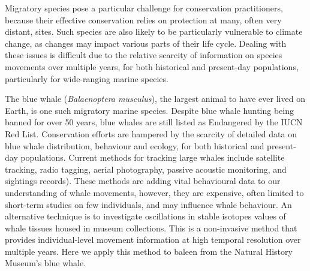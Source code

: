 \documentclass[a4paper,12pt]{article}
\begin{document}
\newpage

Migratory species pose a particular challenge for conservation practitioners, because their effective conservation relies on protection at many, often very distant, sites\cite{runge2014conserving}. 
Such species are also likely to be particularly vulnerable to climate change, as changes may impact various parts of their life cycle\cite{robinson2009travelling}. 
Dealing with these issues is difficult due to the relative scarcity of information on species movements over multiple years, for both historical and present-day populations, particularly for wide-ranging marine species\cite{ryan2013stable,hall2005stable,bailey2009behavioural}. 
 
The blue whale (\textit{Balaenoptera musculus}), the largest animal to have ever lived on Earth, is one such migratory marine species. 
Despite blue whale hunting being banned for over 50 years, blue whales are still listed as Endangered by the IUCN Red List\cite{reilly2008balaenoptera}.
Conservation efforts are hampered by the scarcity of detailed data on blue whale distribution, behaviour and ecology, for both historical and present-day populations. 
Current methods for tracking large whales include satellite tracking, radio tagging, aerial photography, passive acoustic monitoring, and sightings records\cite{borger15,mcdonald2006biogeographic,bailey2009behavioural,mate2007evolution}). 
These methods are adding vital behavioural data to our understanding of whale movements, however, they are expensive, often limited to short-term studies on few individuals\cite{bailey2009behavioural,best2015tag,mate2007evolution}, and may influence whale behaviour\cite{walker2012review}. 
An alternative technique is to investigate oscillations in stable isotopes values of whale tissues housed in museum collections\cite{ryan2013stable}.
This is a non-invasive method that provides individual-level movement information at high temporal resolution over multiple years. 
Here we apply this method to baleen from the Natural History Museum's blue whale.
 
\end{document}
